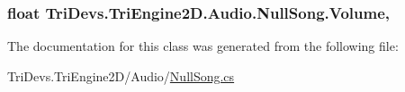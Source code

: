 \hypertarget{class_tri_devs_1_1_tri_engine2_d_1_1_audio_1_1_null_song_a08a8223ecfea0495670583bcfe6fd7bc}{
\subsubsection[{Volume}]{\setlength{\rightskip}{0pt plus 5cm}float Tri\-Devs.\-Tri\-Engine2\-D.\-Audio.\-Null\-Song.\-Volume\hspace{0.3cm}{\ttfamily [get]}, {\ttfamily [set]}}}\label{class_tri_devs_1_1_tri_engine2_d_1_1_audio_1_1_null_song_a08a8223ecfea0495670583bcfe6fd7bc}


The documentation for this class was generated from the following file\-:\begin{DoxyCompactItemize}
\item 
Tri\-Devs.\-Tri\-Engine2\-D/\-Audio/\hyperlink{_null_song_8cs}{Null\-Song.\-cs}\end{DoxyCompactItemize}
